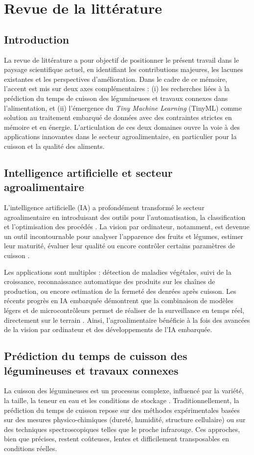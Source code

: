 \chapter{Revue de la littérature}
\label{chap:revue_litterature}

\section{Introduction}
La revue de littérature a pour objectif de positionner le présent travail dans le paysage scientifique actuel, en identifiant les contributions majeures, les lacunes existantes et les perspectives d’amélioration. Dans le cadre de ce mémoire, l’accent est mis sur deux axes complémentaires : (i) les recherches liées à la prédiction du temps de cuisson des légumineuses et travaux connexes dans l’alimentation, et (ii) l’émergence du \textit{Tiny Machine Learning} (TinyML) comme solution au traitement embarqué de données avec des contraintes strictes en mémoire et en énergie. L’articulation de ces deux domaines ouvre la voie à des applications innovantes dans le secteur agroalimentaire, en particulier pour la cuisson et la qualité des aliments.

\section{Intelligence artificielle et secteur agroalimentaire}
L’intelligence artificielle (IA) a profondément transformé le secteur agroalimentaire en introduisant des outils pour l’automatisation, la classification et l’optimisation des procédés \cite{kamilaris2018}. La vision par ordinateur, notamment, est devenue un outil incontournable pour analyser l’apparence des fruits et légumes, estimer leur maturité, évaluer leur qualité ou encore contrôler certains paramètres de cuisson \cite{rahman2020}.

Les applications sont multiples : détection de maladies végétales, suivi de la croissance, reconnaissance automatique des produits sur les chaînes de production, ou encore estimation de la fermeté des denrées après cuisson. Les récents progrès en IA embarquée démontrent que la combinaison de modèles légers et de microcontrôleurs permet de réaliser de la surveillance en temps réel, directement sur le terrain \cite{moeketsi2025, kimutaiforster2024}. Ainsi, l’agroalimentaire bénéficie à la fois des avancées de la vision par ordinateur et des développements de l’IA embarquée.

\section{Prédiction du temps de cuisson des légumineuses et travaux connexes}
La cuisson des légumineuses est un processus complexe, influencé par la variété, la taille, la teneur en eau et les conditions de stockage \cite{singh2019, shimelis2020}. Traditionnellement, la prédiction du temps de cuisson repose sur des méthodes expérimentales basées sur des mesures physico-chimiques (dureté, humidité, structure cellulaire) ou sur des techniques spectroscopiques telles que le proche infrarouge. Ces approches, bien que précises, restent coûteuses, lentes et difficilement transposables en conditions réelles.

